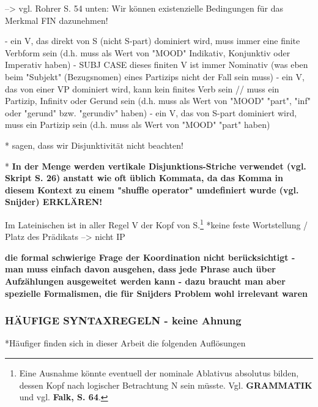 \documentclass[12pt,a4paper]{article}
\begin{document}
--> vgl. Rohrer S. 54 unten: Wir können existenzielle Bedingungen für das Merkmal FIN dazunehmen!

- ein V, das direkt von S (nicht S-part) dominiert wird, muss immer eine
finite Verbform sein (d.h. muss als Wert von "MOOD" Indikativ, Konjunktiv oder
 Imperativ haben)
- SUBJ CASE dieses finiten V ist immer Nominativ (was eben beim "Subjekt"
(Bezugsnomen) eines Partizips nicht der Fall sein muss)
- ein V, das von einer VP dominiert wird, kann kein finites Verb sein //
muss ein Partizip, Infinitv oder Gerund sein (d.h. muss als Wert von "MOOD"
"part", "inf" oder "gerund" bzw. "gerundiv" haben)
- ein V, das von S-part dominiert wird, muss ein Partizip sein (d.h. muss
als Wert von "MOOD" "part" haben)

* sagen, dass wir Disjunktivität nicht beachten!

* \textbf{In der Menge werden vertikale Disjunktions-Striche verwendet (vgl. Skript S. 26) anstatt wie oft üblich Kommata, da das Komma in diesem Kontext zu einem "shuffle operator" umdefiniert wurde (vgl. Snijder) ERKLÄREN!}

Im Lateinischen ist in aller Regel V der Kopf von S.\footnote{Eine Ausnahme könnte eventuell der nominale Ablativus absolutus bilden, dessen Kopf nach logischer Betrachtung N sein müsste. Vgl. \textbf{GRAMMATIK} und vgl. \textbf{Falk, S. 64}.}
*keine feste Wortstellung / Platz des Prädikats --> nicht IP

\textbf{die formal schwierige Frage der Koordination nicht berücksichtigt - man muss einfach davon ausgehen, dass jede Phrase auch über Aufzählungen ausgeweitet werden
kann - dazu braucht man aber spezielle Formalismen, die für Snijders
Problem wohl irrelevant waren}


\subsubsection{HÄUFIGE SYNTAXREGELN - keine Ahnung}
*Häufiger finden sich in dieser Arbeit die folgenden Auflösungen
\end{document}
